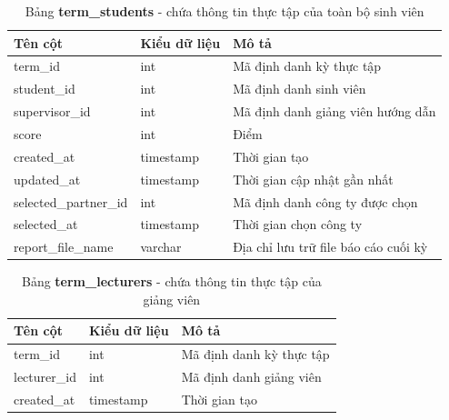 \documentclass[./../main.tex]{subfiles}
\begin{document}
\begin{table}[H]
	\caption[Bảng term\_students]{Bảng \textbf{term\_students} - chứa thông tin thực tập của toàn bộ sinh viên}
	\label{tab:db_term_students}
	\begin{tabular}{|l|l|l|}
		\hline
		\textbf{Tên cột}      & \textbf{Kiểu dữ liệu} & \textbf{Mô tả}                       \\ \hline
		term\_id              & int                   & Mã định danh kỳ thực tập             \\ \hline
		student\_id           & int                   & Mã định danh sinh viên               \\ \hline
		supervisor\_id        & int                   & Mã định danh giảng viên hướng dẫn    \\ \hline
		score                 & int                   & Điểm                                 \\ \hline
		created\_at           & timestamp             & Thời gian tạo                        \\ \hline
		updated\_at           & timestamp             & Thời gian cập nhật gần nhất          \\ \hline
		selected\_partner\_id & int                   & Mã định danh công ty được chọn       \\ \hline
		selected\_at          & timestamp             & Thời gian chọn công ty               \\ \hline
		report\_file\_name    & varchar               & Địa chỉ lưu trữ file báo cáo cuối kỳ \\ \hline
	\end{tabular}
\end{table}



\begin{table}[H]
	\caption[Bảng term\_lecturers]{Bảng \textbf{term\_lecturers} - chứa thông tin thực tập của giảng viên}
	\label{tab:db_term_lecturers}
	\begin{tabular}{|l|l|l|}
		\hline
		\textbf{Tên cột} & \textbf{Kiểu dữ liệu} & \textbf{Mô tả}           \\ \hline
		term\_id         & int                   & Mã định danh kỳ thực tập \\ \hline
		lecturer\_id     & int                   & Mã định danh giảng viên  \\ \hline
		created\_at      & timestamp             & Thời gian tạo            \\ \hline
	\end{tabular}
\end{table}
\end{document}

